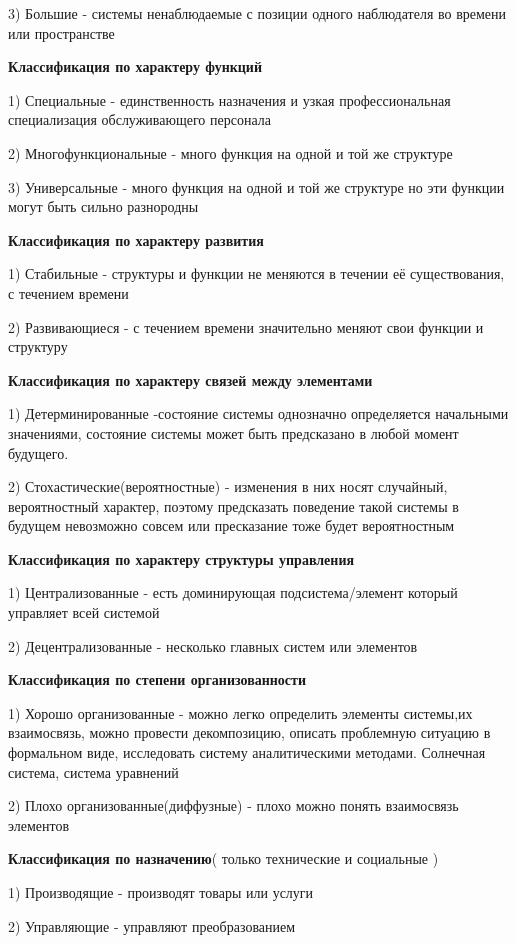 \documentclass[a4paper]{article}
\begin{document}
	3) Большие - системы ненаблюдаемые с позиции одного наблюдателя во времени или пространстве
	
	\textbf{Классификация по характеру функций}
	
	1) Специальные - единственность назначения и узкая профессиональная специализация обслуживающего персонала 
	
	2) Многофункциональные - много функция на одной и той же структуре
	
	3) Универсальные - много функция на одной и той же структуре но эти функции могут быть сильно разнородны
	
	\textbf{Классификация по характеру развития}
	
	1) Стабильные - структуры и функции не меняются в течении её существования, с течением времени 
	
	2) Развивающиеся - с течением времени значительно меняют свои функции и структуру 
	
	\textbf{Классификация по характеру связей между элементами}
	
	1) Детерминированные -состояние системы однозначно определяется начальными значениями, состояние системы может быть предсказано в любой момент будущего.
	
	2) Стохастические(вероятностные) - изменения в них носят случайный, вероятностный характер, поэтому предсказать поведение такой системы в будущем невозможно совсем или пресказание тоже будет вероятностным
	
	\textbf{Классификация по характеру структуры управления }
	
	1) Централизованные - есть доминирующая подсистема/элемент который управляет всей системой
	
	2) Децентрализованные - несколько главных систем или элементов
	
	\textbf{Классификация по степени организованности}
	
	1) Хорошо организованные - можно легко определить элементы системы,их взаимосвязь, можно провести декомпозицию, описать проблемную ситуацию в формальном виде, исследовать систему аналитическими методами. Солнечная система, система уравнений
	
	2) Плохо организованные(диффузные) - плохо можно понять взаимосвязь элементов
	
	\textbf{Классификация по назначению}( только технические и социальные )
	
	1) Производящие - производят товары или услуги
	
	2) Управляющие - управляют преобразованием 
	
\end{document}

